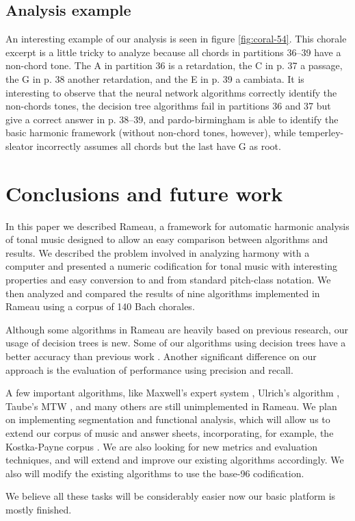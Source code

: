 \documentclass{article}
\begin{document}
\subsection{Analysis example}
\label{sec:analysis-example}

An interesting example of our analysis is seen in figure
\ref{fig:coral-54}. This chorale excerpt is a little tricky to analyze
because all chords in partitions 36--39 have a non-chord tone. The A
in partition 36 is a retardation, the C in p. 37 a passage, the G in
p. 38 another retardation, and the E in p. 39 a cambiata. It is
interesting to observe that the neural network algorithms correctly
identify the non-chords tones, the decision tree algorithms fail in
partitions 36 and 37 but give a correct answer in p. 38--39, and
pardo-birmingham is able to identify the basic harmonic framework
(without non-chord tones, however), while temperley-sleator
incorrectly assumes all chords but the last have G as root.

\section{Conclusions and future work}
\label{sec:concl-future-work}

In this paper we described Rameau, a framework for automatic harmonic
analysis of tonal music designed to allow an easy comparison between
algorithms and results. We described the problem involved in analyzing
harmony with a computer and presented a numeric codification for tonal
music with interesting properties and easy conversion to and from
standard pitch-class notation. We then analyzed and compared the
results of nine algorithms implemented in Rameau using a corpus of 140
Bach chorales.

Although some algorithms in Rameau are heavily based on previous
research, our usage of decision trees is new. Some of our algorithms
using decision trees have a better accuracy than previous work
\cite{pardo.ea:automated, temperley.ea:modeling}. Another significant
difference on our approach is the evaluation of performance using
precision and recall.

A few important algorithms, like Maxwell's expert system
\cite{maxwell:expert}, Ulrich's algorithm \cite{ulrich:analysis},
Taube's MTW \cite{taube:automatic}, and many others are still
unimplemented in Rameau. We plan on implementing segmentation and
functional analysis, which will allow us to extend our corpus of music
and answer sheets, incorporating, for example, the Kostka-Payne corpus
\cite{temperley:bayesian}. We are also looking for new metrics and
evaluation techniques, and will extend and improve our existing
algorithms accordingly. We also will modify the existing algorithms to
use the base-96 codification.

We believe all these tasks will be considerably easier now our basic
platform is mostly finished.




\end{document}
